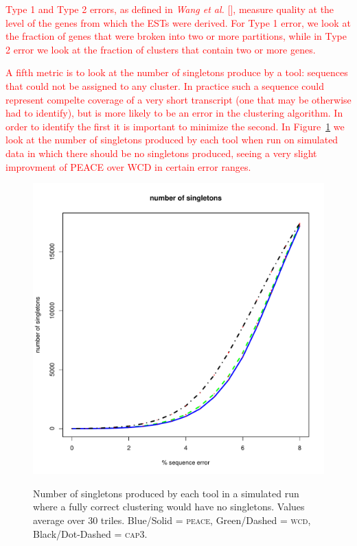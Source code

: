 \documentclass[a4paper,12pt]{article}
\newcommand{\mc}[1]{\textcolor{red}{#1}}
\begin{document}
\begin{appendix}
\mc{Type 1 and Type 2 errors, as defined in {\it Wang et al.}
[\cite{Wang04}], measure quality at the level of the genes from which
the ESTs were derived.  For Type 1 error, we look at the fraction of genes
that were broken into two or more partitions, while in
Type 2 error we look at the fraction of clusters that contain two or
more genes.}

\mc{A fifth metric is to look at the number of singletons produce by a
  tool:  sequences that  could not  be  assigned to  any cluster.   In
  practice such a sequence could represent compelte coverage of a very
  short transcript (one that may be otherwise had to identify), but is
  more likely to be an error in the clustering algorithm.  In order to
  identify  the first  it is  important  to minimize  the second.   In
  Figure~\ref{singletons} we look at the number of singletons produced
  by each tool when run on  simulated data in which there should be no
  singletons produced,  seeing a very slight improvment  of PEACE over
  WCD in certain error ranges.}

\begin{figure}[tbp]
\centerline{
\label{dups}
\includegraphics[scale=0.35]{pics.d/singletons_40.pdf}
}
\caption{Number of singletons produced by each tool in a simulated run
  where a fully correct clustering would have no singletons.  Values
  average over 30 triles.  Blue/Solid = \textsc{peace}, Green/Dashed =
  \textsc{wcd}, Black/Dot-Dashed = \textsc{cap3}.}\label{singletons}
\end{figure}


\end{appendix}
\end{document}
